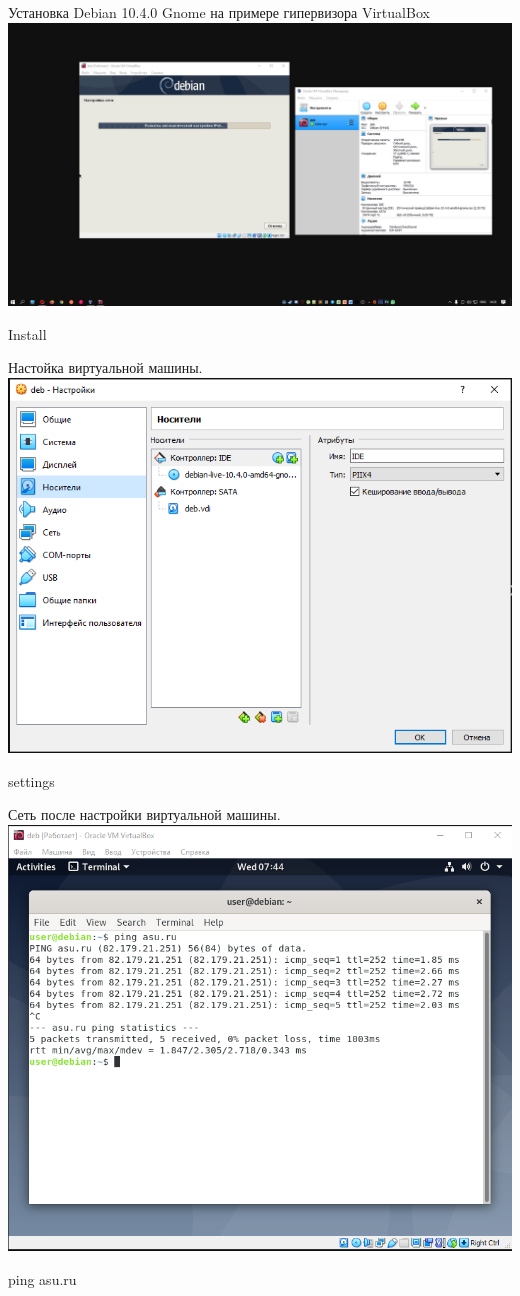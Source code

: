 \documentclass[a4paper,14pt]{extarticle}
\begin{document}
\centering
Установка Debian 10.4.0 Gnome на примере гипервизора VirtualBox
\includegraphics[width=1\linewidth]{install.png}
\caption{Install}
\label{fig:mpr}




\centering
Настойка виртуальной машины.
\includegraphics[width=1\linewidth]{settings.png}
\caption{settings}
\label{fig:mpr}




\centering
Сеть после настройки виртуальной машины.
\includegraphics[width=1\linewidth]{work.png}
\caption{ping asu.ru}
\label{fig:mpr}
\end{document}
